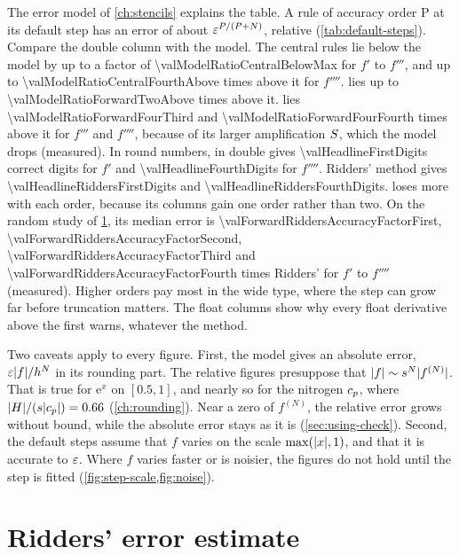 The error model of \cref{ch:stencils} explains the table. A rule of accuracy order P at its default step has an error
of about $\varepsilon^{P/(P+N)}$, relative (\cref{tab:default-steps}). Compare the double column with the model. The
central rules lie below the model by up to a factor of \num{\valModelRatioCentralBelowMax} for $f'$ to $f'''$, and
up to \num{\valModelRatioCentralFourthAbove} times above it for $f''''$.  lies up to
\num{\valModelRatioForwardTwoAbove} times above it.  lies \num{\valModelRatioForwardFourThird} and
\num{\valModelRatioForwardFourFourth} times above it for $f'''$ and $f''''$, because of its larger amplification
$S$, which the model drops (measured). In round numbers,  in double gives
\num{\valHeadlineFirstDigits} correct digits for $f'$ and \num{\valHeadlineFourthDigits} for $f''''$. Ridders' method
gives \num{\valHeadlineRiddersFirstDigits} and \num{\valHeadlineRiddersFourthDigits}.  loses
more with each order, because its columns gain one order rather than two. On the random study of
\cref{sec:guarantees-ridders}, its median error is \num{\valForwardRiddersAccuracyFactorFirst},
\num{\valForwardRiddersAccuracyFactorSecond}, \num{\valForwardRiddersAccuracyFactorThird} and
\num{\valForwardRiddersAccuracyFactorFourth} times Ridders' for $f'$ to $f''''$ (measured). Higher orders pay most in
the wide type, where the step can grow far before truncation matters. The float columns show why every float
derivative above the first warns, whatever the method.

Two caveats apply to every figure. First, the model gives an absolute error, $\varepsilon \lvert f \rvert / h^N$ in its rounding
part. The relative figures presuppose that $\lvert f \rvert \sim s^N \lvert f^{(N)} \rvert$. That is true for $\mathrm{e}^x$ on
$[0.5, 1]$, and nearly so for the nitrogen $c_p$, where $\lvert H \rvert / (s \lvert c_p \rvert) = \num{0.66}$
(\cref{ch:rounding}). Near a zero of $f^{(N)}$, the relative error grows without bound, while the absolute error stays
as it is (\cref{sec:using-check}). Second, the default steps assume that $f$ varies on the scale $\max(\lvert x \rvert, 1)$,
and that it is accurate to $\varepsilon$. Where $f$ varies faster or is noisier, the figures do not hold until the step
is fitted (\cref{fig:step-scale,fig:noise}).

\section{Ridders' error estimate}\label{sec:guarantees-ridders}

